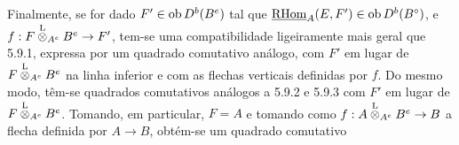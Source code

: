 Finalmente, se for dado $F'\in\operatorname{ob} D^b(B^e)$ tal que $\underline{\mathrm{RHom}}_A(E,F')\in\operatorname{ob} D^b(B^\circ)$, e $f:F\overset{\mathrm L}{\otimes}_{A^e}B^e\to F'$, tem-se uma compatibilidade ligeiramente mais geral que 5.9.1, expressa por um quadrado comutativo análogo, com $F'$ em lugar de $F\overset{\mathrm L}{\otimes}_{A^e}B^e$ na linha inferior e com as flechas verticais definidas por $f$. Do mesmo modo, têm-se quadrados comutativos análogos a 5.9.2 e 5.9.3 com $F'$ em lugar de $F\overset{\mathrm L}{\otimes}_{A^e}B^e$. Tomando, em particular, $F=A$ e tomando como $f:A\overset{\mathrm L}{\otimes}_{A^e}B^e\to B$ a flecha definida por $A\to B$, obtém-se um quadrado comutativo
